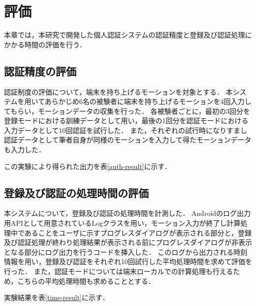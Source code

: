 \chapter{評価}
本章では，本研究で開発した個人認証システムの認証精度と登録及び認証処理にかかる時間の評価を行う．

\section{認証精度の評価}
認証制度の評価について，端末を持ち上げるモーションを対象とする．
本システムを用いてあらかじめ6名の被験者に端末を持ち上げるモーションを4回入力してもらい，モーションデータの収集を行った．
各被験者ごとに，最初の3回分を登録モードにおける訓練データとして用い，最後の1回分を認証モードにおける入力データとして10回認証を試行した．
また，それぞれの試行時になりすまし認証データとして筆者自身が同様のモーションを入力して得たモーションデータも入力した．

この実験により得られた出力を表\ref{auth-result}に示す．


\section{登録及び認証の処理時間の評価}
本システムについて，登録及び認証の処理時間を計測した．
Androidのログ出力用APIとして用意されているLogクラス\cite{5-log}を用い，モーション入力が終了し計算処理中であることをユーザに示すプログレスダイアログが表示される部分と，登録及び認証処理が終わり処理結果が表示される前にプログレスダイアログが非表示となる部分にログ出力を行うコードを挿入した．
このログから出力される時刻情報を用い，登録及び認証をそれぞれ10回試行した平均処理時間を求めて評価を行った．
また，認証モードについては端末ローカルでの計算処理も行えるため，こちらの平均処理時間も求めることとする．

実験結果を表\ref{time-result}に示す．
